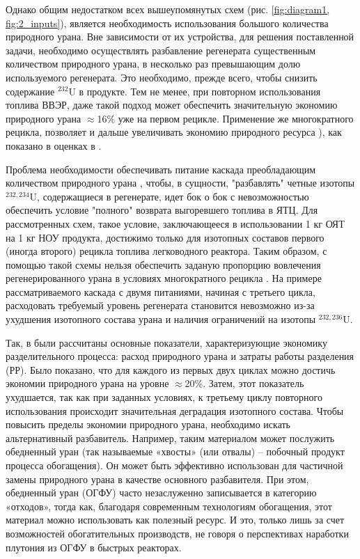 Однако общим недостатком всех вышеупомянутых схем (рис. \ref{fig:diagram1, fig:2_inputs}), является необходимость использования большого количества природного урана.
Вне зависимости от их устройства, для решения поставленной задачи, необходимо осуществлять разбавление регенерата существенным количеством природного урана, в несколько раз превышающим долю используемого регенерата. Это необходимо, прежде всего, чтобы снизить содержание $^{232}$U в продукте.
Тем не менее, при повторном использования топлива ВВЭР, даже такой подход может обеспечить значительную экономию природного урана $\approx$16\% уже на первом рецикле.
Применение же многократного рецикла, позволяет и дальше увеличивать экономию природного ресурса \cite{colemanEvaluationMultipleSelfrecycling2010}), как показано в оценках в \cite{smirnovEvolutionIsotopicComposition2012}.

Проблема необходимости обеспечивать питание каскада преобладающим количеством природного урана , чтобы, в сущности, "разбавлять" четные изотопы  $^{232,234}$U, содержащиеся в регенерате, идет бок о бок с невозможностью обеспечить условие "полного" возврата выгоревшего топлива в ЯТЦ.
Для рассмотренных схем, такое условие, заключающееся в использовании 1 кг ОЯТ на 1 кг НОУ продукта, достижимо только для изотопных составов первого (иногда второго) рецикла топлива легководного реактора.
Таким образом, с помощью такой схемы нельзя обеспечить заданую пропорцию вовлечения регенерированного урана в условиях многократного рецикла \cite{smirnovApplyingEnrichmentCapacities2018}.
На примере рассматриваемого каскада с двумя питаниями, начиная с третьего цикла, расходовать требуемый уровень регенерата становится невозможно из-за ухудшения изотопного состава урана и наличия ограничений на изотопы $^{232,236}$U.

Так, в \cite{smirnovApplyingEnrichmentCapacities2018} были рассчитаны основные показатели, характеризующие экономику разделительного процесса: расход природного урана и затраты работы разделения (РР).
Было показано, что для каждого из первых двух циклах можно достичь экономии природного урана на уровне $\approx$20\%. Затем, этот показатель ухудшается, так как при заданных условиях, к третьему циклу повторного использования происходит значительная деградация изотопного состава.
Чтобы повысить пределы экономии природного урана, необходимо искать альтернативный разбавитель. Например, таким материалом может послужить обедненный уран (так называемые «хвосты» (или отвалы) -- побочный продукт процесса обогащения).
Он может быть эффективно использован для частичной замены природного урана в качестве основного разбавителя.
При этом, обедненный уран (ОГФУ) часто незаслуженно записывается в категорию «отходов», тогда как, благодаря современным технологиям обогащения, этот материал можно использовать как полезный ресурс.
И это, только лишь за счет возможностей обогатительных производств, не говоря о перспективах наработки плутония из ОГФУ в быстрых реакторах.

